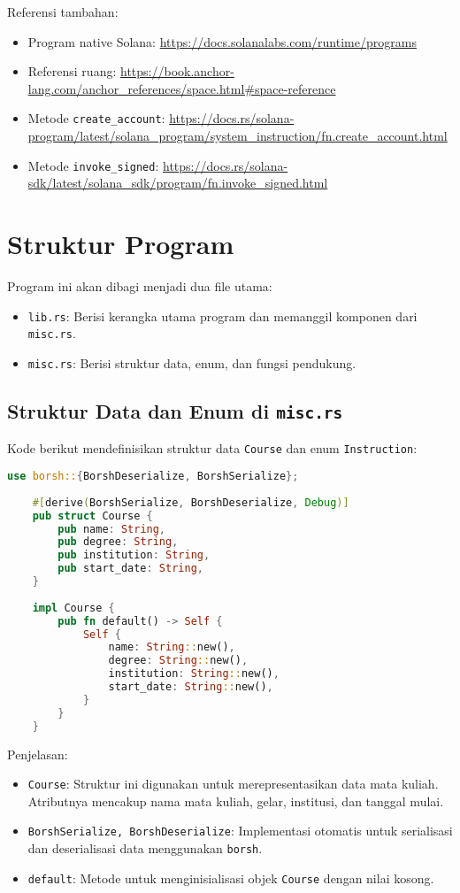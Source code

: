 Referensi tambahan:
\begin{itemize}
	\item Program native Solana: \url{https://docs.solanalabs.com/runtime/programs}
	\item Referensi ruang: \url{https://book.anchor-lang.com/anchor_references/space.html#space-reference}
	\item Metode \texttt{create\_account}: \url{https://docs.rs/solana-program/latest/solana_program/system_instruction/fn.create_account.html}
	\item Metode \texttt{invoke\_signed}: \url{https://docs.rs/solana-sdk/latest/solana_sdk/program/fn.invoke_signed.html}
\end{itemize}

\section{Struktur Program}
Program ini akan dibagi menjadi dua file utama:
\begin{itemize}
	\item \texttt{lib.rs}: Berisi kerangka utama program dan memanggil komponen dari \texttt{misc.rs}.
	\item \texttt{misc.rs}: Berisi struktur data, enum, dan fungsi pendukung.
\end{itemize}

\subsection{Struktur Data dan Enum di \texttt{misc.rs}}
Kode berikut mendefinisikan struktur data \texttt{Course} dan enum \texttt{Instruction}:

\begin{lstlisting}[language=Rust]
	use borsh::{BorshDeserialize, BorshSerialize};
	
	#[derive(BorshSerialize, BorshDeserialize, Debug)]
	pub struct Course {
		pub name: String,
		pub degree: String,
		pub institution: String,
		pub start_date: String,
	}
	
	impl Course {
		pub fn default() -> Self {
			Self {
				name: String::new(),
				degree: String::new(),
				institution: String::new(),
				start_date: String::new(),
			}
		}
	}
\end{lstlisting}

Penjelasan:
\begin{itemize}
	\item \texttt{Course}: Struktur ini digunakan untuk merepresentasikan data mata kuliah. Atributnya mencakup nama mata kuliah, gelar, institusi, dan tanggal mulai.
	\item \texttt{BorshSerialize, BorshDeserialize}: Implementasi otomatis untuk serialisasi dan deserialisasi data menggunakan \texttt{borsh}.
	\item \texttt{default}: Metode untuk menginisialisasi objek \texttt{Course} dengan nilai kosong.
\end{itemize}

